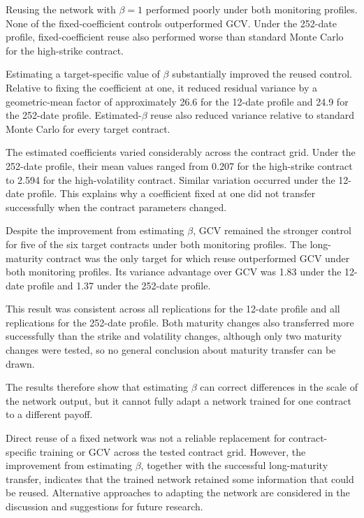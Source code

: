 Reusing the network with $\beta=1$ performed poorly under both monitoring profiles. None of the fixed-coefficient controls outperformed GCV. Under the 252-date profile, fixed-coefficient reuse also performed worse than standard Monte Carlo for the high-strike contract.

Estimating a target-specific value of $\beta$ substantially improved the reused control. Relative to fixing the coefficient at one, it reduced residual variance by a geometric-mean factor of approximately 26.6 for the 12-date profile and 24.9 for the 252-date profile. Estimated-$\beta$ reuse also reduced variance relative to standard Monte Carlo for every target contract.

The estimated coefficients varied considerably across the contract grid. Under the 252-date profile, their mean values ranged from 0.207 for the high-strike contract to 2.594 for the high-volatility contract. Similar variation occurred under the 12-date profile. This explains why a coefficient fixed at one did not transfer successfully when the contract parameters changed.

Despite the improvement from estimating $\beta$, GCV remained the stronger control for five of the six target contracts under both monitoring profiles. The long-maturity contract was the only target for which reuse outperformed GCV under both monitoring profiles. Its variance advantage over GCV was 1.83 under the 12-date profile and 1.37 under the 252-date profile.

This result was consistent across all replications for the 12-date profile and all replications for the 252-date profile. Both maturity changes also transferred more successfully than the strike and volatility changes, although only two maturity changes were tested, so no general conclusion about maturity transfer can be drawn.

The results therefore show that estimating $\beta$ can correct differences in the scale of the network output, but it cannot fully adapt a network trained for one contract to a different payoff.

Direct reuse of a fixed network was not a reliable replacement for contract-specific training or GCV across the tested contract grid. However, the improvement from estimating $\beta$, together with the successful long-maturity transfer, indicates that the trained network retained some information that could be reused. Alternative approaches to adapting the network are considered in the discussion and suggestions for future research.
